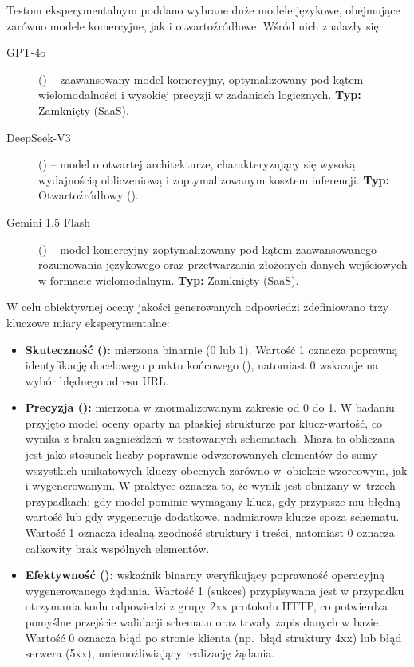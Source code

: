 Testom eksperymentalnym poddano wybrane duże modele językowe, obejmujące zarówno modele komercyjne, jak i otwartoźródłowe. Wśród nich znalazły się: 
\begin{description}
    \item[GPT-4o] () -- zaawansowany model komercyjny, optymalizowany pod kątem wielomodalności i wysokiej precyzji w zadaniach logicznych. \textbf{Typ:} Zamknięty (SaaS).
    
    \item[DeepSeek-V3] () -- model o otwartej architekturze, charakteryzujący się wysoką wydajnością obliczeniową i zoptymalizowanym kosztem inferencji. \textbf{Typ:} Otwartoźródłowy ().
    
    \item[Gemini 1.5 Flash] () -- model komercyjny zoptymalizowany pod kątem zaawansowanego rozumowania językowego oraz przetwarzania złożonych danych wejściowych w formacie wielomodalnym. \textbf{Typ:} Zamknięty (SaaS).
\end{description}

W celu obiektywnej oceny jakości generowanych odpowiedzi zdefiniowano trzy kluczowe miary eksperymentalne:
\begin{itemize}
    \item \textbf{Skuteczność ():} mierzona binarnie (0 lub 1). Wartość 1 oznacza poprawną identyfikację docelowego punktu końcowego (), natomiast 0 wskazuje na wybór błędnego adresu URL.
    \item \textbf{Precyzja ():} mierzona w znormalizowanym zakresie od 0 do 1. W badaniu przyjęto model oceny oparty na płaskiej strukturze par klucz-wartość, co wynika z braku zagnieżdżeń w testowanych schematach. Miara ta obliczana jest jako stosunek liczby poprawnie odwzorowanych elementów do sumy wszystkich unikatowych kluczy obecnych zarówno w~obiekcie wzorcowym, jak i wygenerowanym. W praktyce oznacza to, że wynik jest obniżany w~trzech przypadkach: gdy model pominie wymagany klucz, gdy przypisze mu błędną wartość lub gdy wygeneruje dodatkowe, nadmiarowe klucze spoza schematu. Wartość 1 oznacza idealną zgodność struktury i treści, natomiast 0 oznacza całkowity brak wspólnych elementów.
    \item \textbf{Efektywność ():} wskaźnik binarny weryfikujący poprawność operacyjną wygenerowanego żądania. Wartość 1 (sukces) przypisywana jest w przypadku otrzymania kodu odpowiedzi z grupy 2xx protokołu HTTP, co potwierdza pomyślne przejście walidacji schematu oraz trwały zapis danych w bazie. Wartość 0 oznacza błąd po stronie klienta (np.~błąd struktury 4xx) lub błąd serwera (5xx), uniemożliwiający realizację żądania.
\end{itemize}

